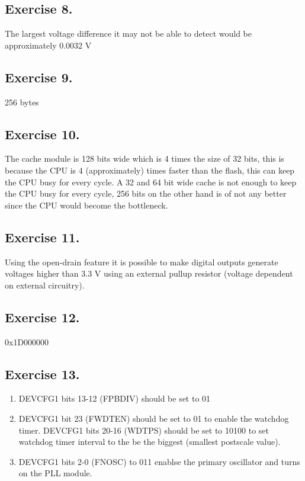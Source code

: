 \documentclass[12pt]{article}
\begin{document}
\subsection*{Exercise 8.}
The largest voltage difference it may not be able to detect would be approximately 0.0032 V

\subsection*{Exercise 9.}
256 bytes 

\subsection*{Exercise 10.}
The cache module is 128 bits wide which is 4 times the size of 32 bits, this is because the CPU is 4 (approximately) times faster than the flash, this can keep the CPU busy for every cycle.
A 32 and 64 bit wide cache is not enough to keep the CPU busy for every cycle, 256 bits on the other hand is of not any better since the CPU would become the bottleneck.

\subsection*{Exercise 11.}
Using the open-drain feature it is possible to make digital outputs generate voltages higher than 3.3 V using an external pullup resistor (voltage dependent on external circuitry).

\subsection*{Exercise 12.}
0x1D000000

\subsection*{Exercise 13.}
\begin{enumerate}
    \item 
    DEVCFG1 bits 13-12 (FPBDIV) should be set to 01

    \item 
    DEVCFG1 bit 23 (FWDTEN) should be set to 01 to enable the watchdog timer.
    DEVCFG1 bits 20-16 (WDTPS) should be set to 10100 to set watchdog timer interval to the be the biggest (smallest postscale value).

    \item 
    DEVCFG1 bits 2-0 (FNOSC) to 011  enablse the primary oscillator and turns on the PLL module.

\end{enumerate}
\end{document}
